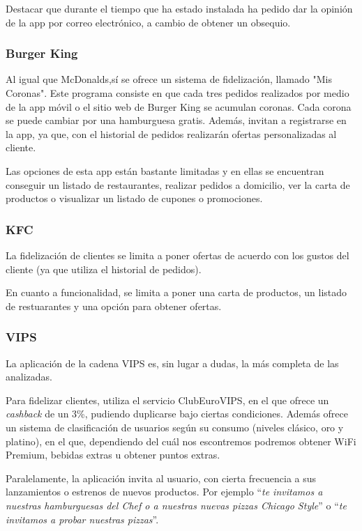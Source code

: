\documentclass[twoside]{report}
\begin{document}
Destacar que durante el tiempo que ha estado instalada ha pedido dar la opinión de la app por correo electrónico, a cambio de obtener un obsequio.

\subsubsection{Burger King \cite{burgerk}}

Al igual que McDonalds,sí se ofrece un sistema de fidelización, llamado "Mis Coronas". Este programa consiste en que cada tres pedidos realizados por medio de la app móvil o el sitio web de Burger King se acumulan coronas. Cada corona se puede cambiar por una hamburguesa gratis. Además, invitan a registrarse en la app, ya que, con el historial de pedidos realizarán ofertas personalizadas al cliente.

Las opciones de esta app están bastante limitadas y en ellas se encuentran conseguir un listado de restaurantes, realizar pedidos a domicilio, ver la carta de productos o visualizar un listado de cupones o promociones.

\subsubsection{KFC \cite{kfcapp}}

La fidelización de clientes se limita a poner ofertas de acuerdo con los gustos del cliente (ya que utiliza el historial de pedidos).

En cuanto a funcionalidad, se limita a poner una carta de productos, un listado de restuarantes y una opción para obtener ofertas.

\subsubsection{VIPS \cite{vipsapp}}

La aplicación de la cadena VIPS es, sin lugar a dudas, la más completa de las analizadas.

Para fidelizar clientes, utiliza el servicio ClubEuroVIPS, en el que ofrece un \textit{cashback} de un 3\%, pudiendo duplicarse bajo ciertas condiciones. Además ofrece un sistema de clasificación de usuarios según su consumo (niveles clásico, oro y platino), en el que, dependiendo del cuál nos escontremos podremos obtener WiFi Premium, bebidas extras u obtener puntos extras.

Paralelamente, la aplicación invita al usuario, con cierta frecuencia a sus lanzamientos o estrenos de nuevos productos. Por ejemplo “\textit{te invitamos a nuestras hamburguesas del Chef o a nuestras nuevas pizzas Chicago Style}” o “\textit{te invitamos a probar nuestras pizzas}”.
\end{document}
